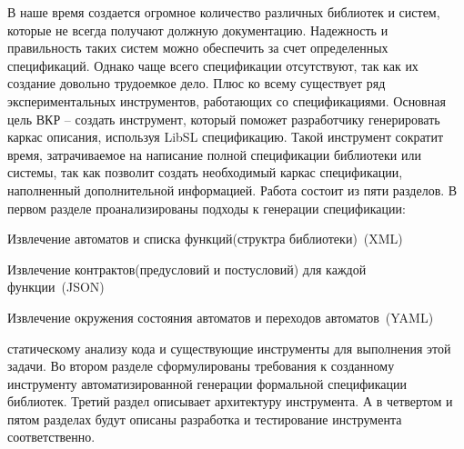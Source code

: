 \intro

В наше время создается огромное количество различных библиотек и систем, которые не всегда получают должную документацию. Надежность и правильность таких систем можно обеспечить за счет определенных спецификаций.
Однако чаще всего спецификации отсутствуют, так как их создание довольно трудоемкое дело. Плюс ко всему существует ряд экспериментальных инструментов, работающих со спецификациями.
Основная цель ВКР – создать инструмент, который поможет разработчику генерировать каркас описания, используя LibSL спецификацию. Такой инструмент сократит время, затрачиваемое на написание полной спецификации библиотеки или системы, так как позволит создать необходимый каркас спецификации, наполненный дополнительной информацией.
Работа состоит из пяти разделов. В первом разделе проанализированы подходы к генерации спецификации:
%
\begin{itemize*}
\item Извлечение автоматов и списка функций(структра библиотеки)~(XML)
\item Извлечение контрактов(предусловий и постусловий) для каждой функции~(JSON)
\item Извлечение окружения состояния автоматов и переходов автоматов~(YAML)
\end{itemize*}
%

статическому анализу кода и существующие инструменты для выполнения этой задачи. Во втором разделе сформулированы требования к созданному инструменту автоматизированной генерации формальной спецификации библиотек. Третий раздел описывает архитектуру инструмента. А в четвертом и пятом разделах будут описаны разработка и тестирование инструмента соответственно.
